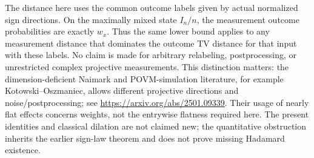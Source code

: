 The distance here uses the common outcome labels given by actual
normalized sign directions. On the maximally mixed state $I_n/n$,
the measurement outcome probabilities are exactly $w_x$. Thus the
same lower bound applies to any measurement distance that dominates
the outcome TV distance for that input with these labels. No claim
is made for arbitrary relabeling, postprocessing, or unrestricted
complex projective measurements. This distinction matters: the
dimension-deficient Naimark and POVM-simulation literature, for
example Kotowski--Oszmaniec, allows different projective directions
and noise/postprocessing; see
\url{https://arxiv.org/abs/2501.09339}. Their usage of nearly flat
effects concerns weights, not the entrywise flatness required here.
The present identities and classical dilation are not claimed new;
the quantitative obstruction inherits the earlier sign-law theorem
and does not prove missing Hadamard existence.


